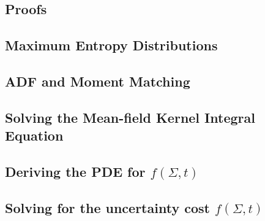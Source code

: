 \documentclass[nobib,justified]{tufte-latex-3.5.0/tufte-book}%
\begin{document}
\begin{appendices}

\chapter{Proofs}
\section{Maximum Entropy Distributions}
\label{app:entropy}

\section{ADF and Moment Matching}
\label{app:moment}

\section{Solving the Mean-field Kernel Integral Equation}
\label{app:kernel_integral}

\section{Deriving the PDE for $f(\Sigma,t)$}
\label{app:f_sigma}

\section{Solving for the uncertainty cost $f(\Sigma,t)$}
\label{app:feynman_kac}

\end{appendices}
\end{document}
